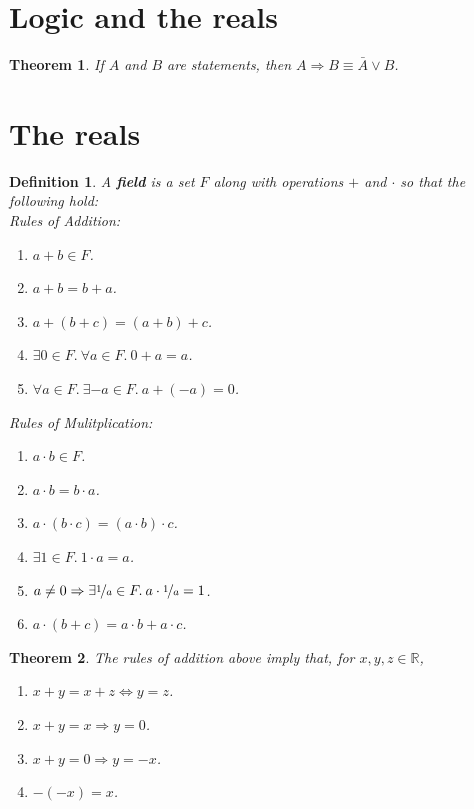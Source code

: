 \documentclass{article}
\theoremstyle{sltheorem}
\newtheorem{definition}{Definition}[section]
\newtheorem{theorem}{Theorem}[section]
\newcommand{\R}{\mathbb{R}}
\begin{document}
\section{Logic and the reals}
\begin{theorem}
    If $A$ and $B$ are statements, then $A\Rightarrow B\equiv \bar{A}\vee B$.
\end{theorem}
\section{The reals}
\begin{definition}
    A \textbf{field} is a set $F$ along with operations $+$ and $\cdot$ so that the following hold:\\
    Rules of Addition:
    \begin{enumerate}
        \item $a+b\in F$.
        \item $a+b = b+a$.
        \item $a+(b+c) = (a+b)+c$.
        \item $\exists 0\in F.\: \forall a\in F.\: 0+a=a$.
        \item $\forall a\in F.\: \exists -a\in F.\: a+(-a)=0$.
    \end{enumerate}
    Rules of Mulitplication:
    \begin{enumerate}
        \item $a\cdot b \in F$.
        \item $a\cdot b = b\cdot a$.
        \item $a\cdot(b\cdot c)=(a\cdot b)\cdot c$.
        \item $\exists 1\in F.\: 1\cdot a = a$.
        \item $a\not=0\Rightarrow\exists \nicefrac{1}{a}\in F.\: a\cdot\nicefrac{1}{a}=1$.
        \item $a\cdot (b+c) = a\cdot b + a\cdot c$.
    \end{enumerate}
\end{definition}
\begin{theorem}
    The rules of addition above imply that, for $x,y,z\in \R$,
    \begin{enumerate}
        \item $x+y=x+z\Leftrightarrow y=z$.
        \item $x+y=x\Rightarrow y=0$.
        \item $x+y=0\Rightarrow y=-x$.
        \item $-(-x)=x$.
    \end{enumerate}
\end{theorem}
\end{document}

